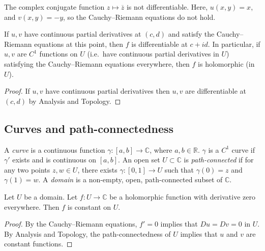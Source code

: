 \begin{example}
	The complex conjugate function \( z \mapsto \overline z \) is not differentiable.
	Here, \( u(x,y) = x \), and \( v(x,y) = -y \), so the Cauchy--Riemann equations do not hold.
\end{example}
\begin{corollary}
	If \( u, v \) have continuous partial derivatives at \( (c,d) \) and satisfy the Cauchy--Riemann equations at this point, then \( f \) is differentiable at \( c + id \).
	In particular, if \( u,v \) are \( C^1 \) functions on \( U \) (i.e.\ have continuous partial derivatives in \( U \)) satisfying the Cauchy--Riemann equations everywhere, then \( f \) is holomorphic (in \( U \)).
\end{corollary}
\begin{proof}
	If \( u,v \) have continuous partial derivatives then \( u, v \) are differentiable at \( (c,d) \) by Analysis and Topology.
\end{proof}

\subsection{Curves and path-connectedness}
\begin{definition}
	A \textit{curve} is a continuous function \( \gamma \colon [a,b] \to \mathbb C \), where \( a,b \in \mathbb R \).
	\( \gamma \) is a \( C^1 \) curve if \( \gamma' \) exists and is continuous on \( [a,b] \).
	An open set \( U \subset \mathbb C \) is \textit{path-connected} if for any two points \( z,w \in U \), there exists \( \gamma \colon [0,1] \to U \) such that \( \gamma(0) = z \) and \( \gamma(1) = w \).
	A \textit{domain} is a non-empty, open, path-connected subset of \( \mathbb C \).
\end{definition}
\begin{corollary}
	Let \( U \) be a domain.
	Let \( f \colon U \to \mathbb C \) be a holomorphic function with derivative zero everywhere.
	Then \( f \) is constant on \( U \).
\end{corollary}
\begin{proof}
	By the Cauchy--Riemann equations, \( f' = 0 \) implies that \( Du = Dv = 0 \) in \( U \).
	By Analysis and Topology, the path-connectedness of \( U \) implies that \( u \) and \( v \) are constant functions.
\end{proof}

